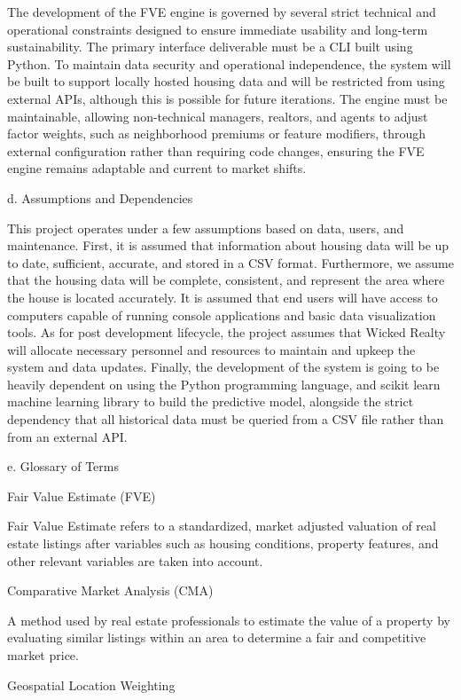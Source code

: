 \documentclass[
]{article}
\begin{document}
The development of the FVE engine is governed by several strict
technical and operational constraints designed to ensure immediate
usability and long-term sustainability. The primary interface
deliverable must be a CLI built using Python. To maintain data security
and operational independence, the system will be built to support
locally hosted housing data and will be restricted from using external
APIs, although this is possible for future iterations. The engine must
be maintainable, allowing non-technical managers, realtors, and agents
to adjust factor weights, such as neighborhood premiums or feature
modifiers, through external configuration rather than requiring code
changes, ensuring the FVE engine remains adaptable and current to market
shifts.

d. Assumptions and Dependencies

This project operates under a few assumptions based on data, users, and
maintenance. First, it is assumed that information about housing data
will be up to date, sufficient, accurate, and stored in a CSV format.
Furthermore, we assume that the housing data will be complete,
consistent, and represent the area where the house is located
accurately. It is assumed that end users will have access to computers
capable of running console applications and basic data visualization
tools. As for post development lifecycle, the project assumes that
Wicked Realty will allocate necessary personnel and resources to
maintain and upkeep the system and data updates. Finally, the
development of the system is going to be heavily dependent on using the
Python programming language, and scikit learn machine learning library
to build the predictive model, alongside the strict dependency that all
historical data must be queried from a CSV file rather than from an
external API.

e. Glossary of Terms

Fair Value Estimate (FVE)

Fair Value Estimate refers to a standardized, market adjusted valuation
of real estate listings after variables such as housing conditions,
property features, and other relevant variables are taken into account.

Comparative Market Analysis (CMA)

A method used by real estate professionals to estimate the value of a
property by evaluating similar listings within an area to determine a
fair and competitive market price.

Geospatial Location Weighting
\end{document}
